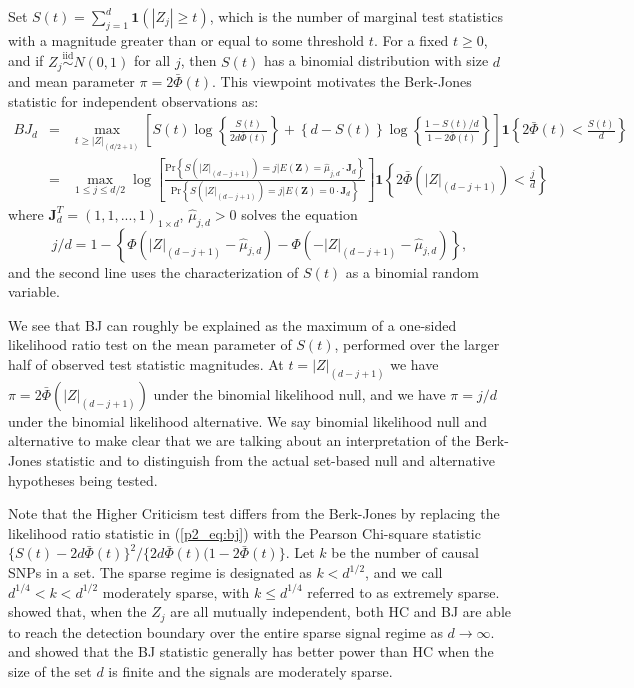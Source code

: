 \documentclass[12pt]{article}
\begin{document}
Set $S(t)=\sum_{j=1}^{d}\mathbf{1}\left(|Z_{j}|\geq t\right)$, which is the number of marginal 
test statistics with a magnitude greater than or equal to some threshold $t$.  
For a fixed $t\geq0$, and if $Z_{j}\overset{\text{iid}}{\sim}N(0,1)$ for all $j$, then $S(t)$ has
a binomial distribution with size $d$ and mean parameter $\pi=2\bar{\Phi}(t)$. 
This viewpoint motivates the Berk-Jones statistic for independent observations \citep{HC} as:
\begingroup
	\makeatletter\def\f@size{11}\check@mathfonts
	\begin{eqnarray}
	BJ_{d}
 	& = & \max_{t \geq |Z|_{(d/2+1)}}\left[S(t)\log\left\{ \frac{S(t)}{2d\bar{\Phi}(t)}\right\} +\left\{ d-S(t)\right\} \log\left\{ \frac{1-S(t)/d}	{1-2\bar{\Phi}(t)}\right\} \right]\mathbf{1}\left\{ 2\bar{\Phi}(t)<\frac{S(t)}{d}\right\} \label{p2_eq:bj}\\
  	& = & \max_{1\leq j\leq d/2}\log\left[\frac{\text{Pr}\left\{ S(|Z|_{(d-j+1)})=j\bigg| E(\mathbf{Z}) = \widehat{\mu}_{j,d} \cdot \mathbf{J}_{d} \right\} }{\text{Pr}\left\{ S(|Z|_{(d-j+1)})=j\bigg| E(\mathbf{Z}) = 0 \cdot \mathbf{J}_{d} \right\} }\right]\mathbf{1}\left\{2\bar{\Phi}\left(|Z|_{(d-j+1)}\right)<\frac{j}{d}\right\}  \nonumber 
	\end{eqnarray}
\endgroup
where $\mathbf{J}_{d}^{T} = (1,1,...,1)_{1\times d}$,  $\widehat{\mu}_{j,d}>0$ solves the equation 
\begin{equation}
j/d = 1 - \left\{ \Phi(|Z|_{(d-j+1)}-\widehat{\mu}_{j,d})-\Phi(-|Z|_{(d-j+1)}-\widehat{\mu}_{j,d})\right\},
\label{p2_eq:mu_Z}
\end{equation}
and the second line uses the characterization of $S(t)$ as a binomial random variable.

We see that BJ can roughly be explained as the maximum of a one-sided likelihood ratio test
on the mean parameter of $S(t)$, performed over the larger half of observed test statistic magnitudes.
At $t=|Z|_{(d-j+1)}$ we have $\pi=2\bar{\Phi} \left(|Z|_{(d-j+1)}\right)$ under the binomial likelihood null, and 
we have $\pi=j/d$ under the binomial likelihood alternative.
We say binomial likelihood null and alternative to make clear that we are talking about an 
interpretation of the Berk-Jones statistic and to distinguish from the actual set-based null and 
alternative hypotheses being tested.

Note that the Higher Criticism test differs from the Berk-Jones by replacing the likelihood 
ratio statistic in (\ref{p2_eq:bj}) with the Pearson Chi-square statistic $\{S(t)-2d\bar\Phi(t)\}^2/\{2d\bar\Phi(t)(1-2\bar\Phi(t)\}$. 
Let $k$ be the number of causal SNPs in a set. 
The sparse regime is designated as $k<d^{1/2}$, and we call $d^{1/4}<k<d^{1/2}$ moderately 
sparse, with $k\leq d^{1/4}$ referred to as extremely sparse.
\citet{HC} showed that, when the $Z_{j}$ are all mutually independent, both HC and BJ are able to 
reach the detection boundary over the entire sparse signal regime as $d\rightarrow\infty$.  
\citet{ALR} and \citet{LiSiegmund}  showed that the BJ statistic generally has better 
power than HC when the size of the set  $d$ is finite and the signals are moderately sparse.
 
\end{document}
